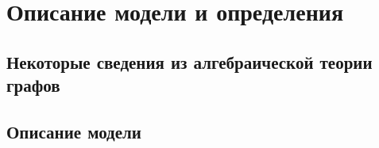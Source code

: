 \chapter{Описание модели и определения} \label{definitions}

\section{Некоторые сведения из алгебраической теории графов}
\section{Описание модели}

\clearpage
